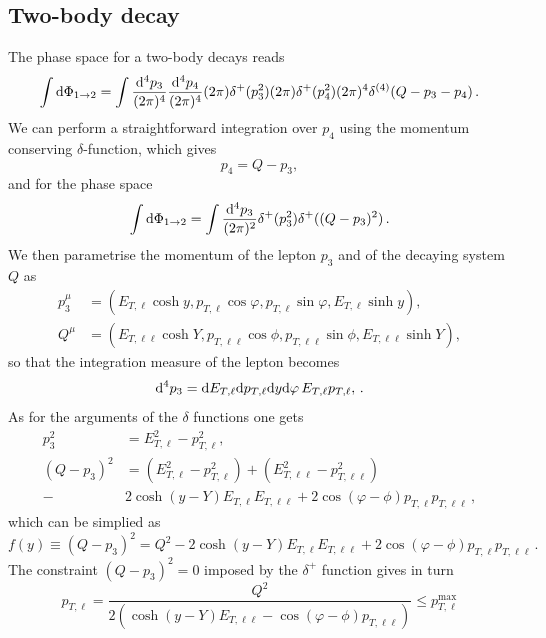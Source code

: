 \documentclass[a4paper,11pt]{article}
\begin{document}
\subsection{Two-body decay}
\label{se:twobodydecay}
The phase space for a two-body decays reads
\begin{equation}
\int\mathrm d\Phi_{1\to2} = \int \frac{\mathrm d^4 p_3}{(2\pi)^4} \frac{\mathrm d^4 p_4}{(2\pi)^4} 
(2\pi) \delta^{+}(p^2_3) (2\pi)\delta^{+}(p^2_4) (2\pi)^4\delta^{(4)}(Q - p_3 - p_4)\, .
\end{equation}
We can perform a straightforward integration over $p_4$ using the momentum conserving 
$\delta$-function, which gives
\begin{equation}
p_4 = Q - p_3,
\end{equation}
and for the phase space
\begin{equation}
\int \mathrm d \Phi_{1\to 2} = 
\int \frac{\mathrm d^4 p_3}{(2\pi)^2} \delta^{+}(p^2_3) \delta^{+}((Q-p_3)^2)\,.
\end{equation}
We then parametrise the momentum of the lepton $p_3$ 
and of the decaying system $Q$ as
\begin{align}
\label{eq:leptonparametrization}
p^\mu_3 &= \left(
E_{T,\ell} \cosh y,
p_{T,\ell} \cos\varphi,
p_{T,\ell} \sin\varphi,
E_{T,\ell} \sinh y
\right), \\
%
Q^\mu &= \left(
E_{T,\ell\ell} \cosh Y,
p_{T,\ell\ell} \cos\phi,
p_{T,\ell\ell} \sin\phi,
E_{T,\ell\ell} \sinh Y
\right),
\end{align}
so that the integration measure of the lepton becomes
\begin{equation}
\mathrm d^4 p_3 = \mathrm d E_{T,\ell} \mathrm d p_{T,\ell} \mathrm d y \mathrm d\varphi \, E_{T,\ell}p_{T,\ell},\, .
\end{equation}
As for the arguments of the $\delta$ functions one gets
\begin{align}
p^2_3 &= E^2_{T,\ell} - p_{T,\ell}^2,\\
(Q-p_3)^2 &= (E^2_{T,\ell} - p_{T,\ell}^2) + (E^2_{T,\ell\ell} - p_{T,\ell\ell}^2) 
\nonumber \\
-& 2 \cosh(y-Y) E_{T,\ell} E_{T,\ell\ell} + 2\cos(\varphi-\phi) p_{T,\ell} p_{T,\ell\ell}\,,
\end{align}
which can be simplied as
\begin{equation}
f(y) \equiv (Q-p_3)^2 = Q^2 -2 \cosh(y-Y) E_{T,\ell} E_{T,\ell\ell} + 2\cos(\varphi-\phi) p_{T,\ell} p_{T,\ell\ell}\, .
\end{equation}
The constraint $(Q-p_3)^2 = 0$ imposed by the $\delta^+$ function gives in turn
\begin{equation}
p_{T,\ell} = \frac{Q^2}{2\left(\cosh(y-Y)E_{T,\ell\ell} - \cos(\varphi-\phi)p_{T,\ell\ell}\right)} \le p^{\max}_{T,\ell}
\end{equation}
\end{document}
